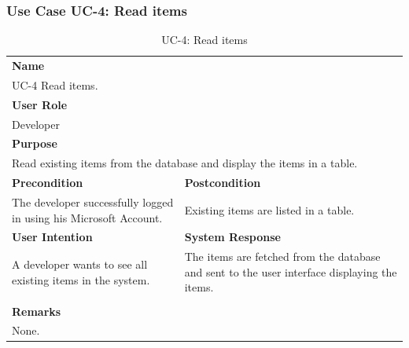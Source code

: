 \subsubsection{Use Case UC-4: Read items}\label{subsubsec:use-case-uc-4:-read-items}

\begin{table}[H]
    \centering
    \begin{tabular}{|p{}|p{}|}

        \hline
        \multicolumn{2}{|l|}{\rowcolor{gray!50}\textbf{Name}} \\
        \multicolumn{2}{|l|}{UC-4 Read items.} \\ \hline

        \multicolumn{2}{|l|}{\rowcolor{gray!50}\textbf{User Role}} \\
        \multicolumn{2}{|l|}{Developer} \\ \hline

        \multicolumn{2}{|l|}{\rowcolor{gray!50}\textbf{Purpose}} \\
        \multicolumn{2}{|l|}{Read existing items from the database and display the items in a table.} \\ \hline

        \rowcolor{gray!50}\textbf{Precondition} & \rowcolor{gray!50}\textbf{Postcondition} \\
        The developer successfully logged in using his Microsoft Account.
        &
        Existing items are listed in a table.  \\ \hline

        \rowcolor{gray!50}\textbf{User Intention} & \rowcolor{gray!50}\textbf{System Response} \\
        A developer wants to see all existing items in the system.
        &
        The items are fetched from the database and sent to the user interface displaying the items. \\ \hline

        & \\ \hline

        \multicolumn{2}{|l|}{\rowcolor{gray!50}\textbf{Remarks}} \\
        \multicolumn{2}{|p{1\textwidth}|}{None.} \\ \hline
    \end{tabular}
    \caption{UC-4: Read items}
    \label{tab:uc-read-items}
\end{table}

